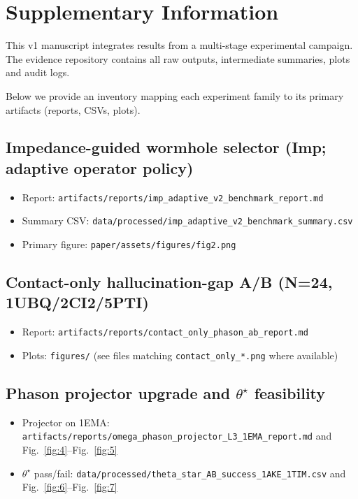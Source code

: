 \section*{Supplementary Information}

This v1 manuscript integrates results from a multi-stage experimental campaign. The evidence repository contains all raw outputs, intermediate summaries, plots and audit logs.

Below we provide an inventory mapping each experiment family to its primary artifacts (reports, CSVs, plots).

\subsection*{Impedance-guided wormhole selector (Imp; adaptive operator policy)}
\begin{itemize}
  \item Report: \texttt{artifacts/reports/imp\_adaptive\_v2\_benchmark\_report.md}
  \item Summary CSV: \texttt{data/processed/imp\_adaptive\_v2\_benchmark\_summary.csv}
  \item Primary figure: \texttt{paper/assets/figures/fig2.png}
\end{itemize}

\subsection*{Contact-only hallucination-gap A/B (N=24, 1UBQ/2CI2/5PTI)}
\begin{itemize}
  \item Report: \texttt{artifacts/reports/contact\_only\_phason\_ab\_report.md}
  \item Plots: \texttt{figures/} (see files matching \texttt{contact\_only\_*.png} where available)
\end{itemize}

\subsection*{Phason projector upgrade and $\theta^\star$ feasibility}
\begin{itemize}
  \item Projector on 1EMA: \texttt{artifacts/reports/omega\_phason\_projector\_L3\_1EMA\_report.md} and Fig.~\ref{fig:4}--Fig.~\ref{fig:5}
  \item $\theta^\star$ pass/fail: \texttt{data/processed/theta\_star\_AB\_success\_1AKE\_1TIM.csv} and Fig.~\ref{fig:6}--Fig.~\ref{fig:7}
\end{itemize}


